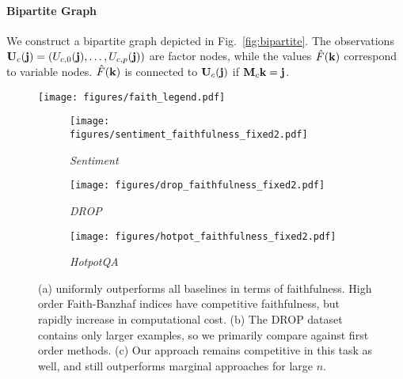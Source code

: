 \paragraph{Bipartite Graph} We construct a bipartite graph depicted in Fig.~\ref{fig:bipartite}. 
%
The observations $ \mathbf U_c(\mathbf j) = (U_{c,0}(\mathbf j), \dotsc, U_{c,p}(\mathbf j))$ are factor nodes, while the values $\hat{F}(\mathbf k)$ correspond to variable nodes.
%
$\hat{F}(\mathbf k)$ is connected to $\mathbf U_c(\mathbf j)$ if $\mathbf M_c \mathbf k = \mathbf j$.
%
\begin{figure*}[t!]
\centering
\begin{center} 
  \texttt{[image: figures/faith\_legend.pdf]}
\end{center}

\begin{subfigure}[t]{\textwidth}
\centering
 \texttt{[image: figures/sentiment\_faithfulness\_fixed2.pdf]}
 \vspace{-.2cm}
 \caption{\emph{Sentiment}}
     \label{fig:faith_sentiment}
\end{subfigure}
\begin{subfigure}[b]{.48\textwidth}
  \centering
  \texttt{[image: figures/drop\_faithfulness\_fixed2.pdf]}
   \vspace{-.2cm}
  \caption{\emph{DROP}}
  \label{fig:faith_drop}
\end{subfigure}%
\begin{subfigure}[b]{.48\textwidth}
  \centering
  \texttt{[image: figures/hotpot\_faithfulness\_fixed2.pdf]}
   \vspace{-.2cm}
  \caption{\emph{HotpotQA}}
  \label{fig:faith_hotpot}
\end{subfigure}
\vspace{-4pt}
\caption{(a) \SpecExp{} uniformly outperforms all baselines in terms of faithfulness. High order Faith-Banzhaf indices have competitive faithfulness, but rapidly increase in computational cost. (b) The DROP dataset contains only larger examples, so we primarily compare against first order methods.  (c) Our approach remains competitive in this task as well,  and still outperforms marginal approaches for large $n$. 
}
\label{fig:faith}
\vspace{-12pt}
\end{figure*}
%

\vspace{-7pt}
